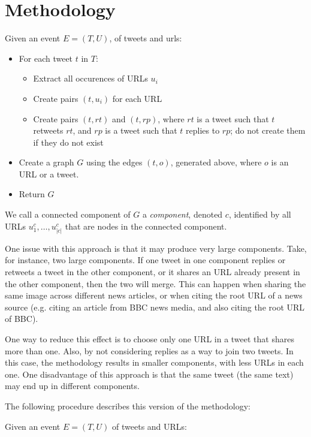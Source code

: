 \documentclass{article}
\begin{document}
\section{Methodology}

Given an event $E=(T, U)$, of tweets and urls:

\begin{itemize}
\item For each tweet $t$ in $T$:
  \begin{itemize}
  \item Extract all occurences of URLs $u_i$
  \item Create pairs $(t, u_i)$ for each URL
  \item Create pairs $(t, rt)$ and $(t, rp)$, where $rt$ is a tweet
    such that $t$ retweets $rt$, and $rp$ is a tweet such that $t$
    replies to $rp$; do not create them if they do not exist
  \end{itemize}
\item Create a graph $G$ using the edges $(t, o)$, generated above,
  where $o$ is an URL or a tweet.
\item Return $G$
\end{itemize}

We call a connected component of $G$ a \emph{component}, denoted $c$,
identified by all URLs $u^c_1, \ldots, u^c_{|c|}$ that are nodes in
the connected component.

One issue with this approach is that it may produce very large
components. Take, for instance, two large components. If one tweet in
one component replies or retweets a tweet in the other component, or
it shares an URL already present in the other component, then the two
will merge. This can happen when sharing the same image across
different news articles, or when citing the root URL of a news source
(e.g. citing an article from BBC news media, and also citing the
root URL of BBC).

One way to reduce this effect is to choose only one URL in a tweet
that shares more than one. Also, by not considering replies as a way
to join two tweets. In this case, the methodology results in smaller
components, with less URLs in each one. One disadvantage of this
approach is that the same tweet (the same text) may end up in
different components.

The following procedure describes this version of the methodology:

Given an event $E = (T, U)$ of tweets and URLs:
\end{document}

